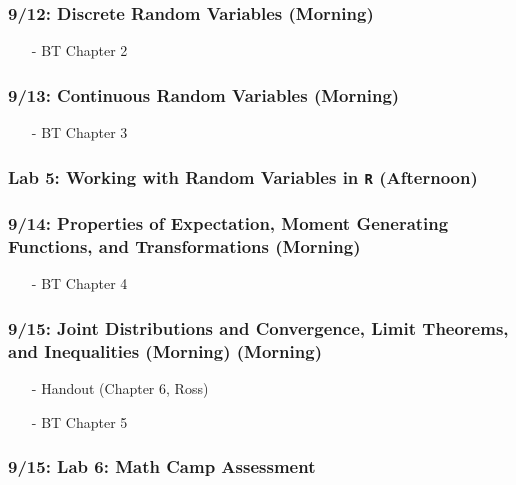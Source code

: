 \documentclass[11pt,letterpaper]{article}
\numberwithin{equation}{section}
\begin{document}
\subsubsection*{9/12: Discrete Random Variables (Morning)}

\begin{itemize}
\item[-] BT Chapter 2
\end{itemize}


\subsubsection*{9/13: Continuous Random Variables (Morning)}

\begin{itemize}
\item[-] BT Chapter 3
\end{itemize}


\subsubsection*{Lab 5: Working with Random Variables in {\tt R} (Afternoon)}


\subsubsection*{9/14: Properties of Expectation, Moment Generating Functions, and Transformations (Morning)}

\begin{itemize}
\item[-] BT Chapter 4
\end{itemize}


\subsubsection*{9/15: Joint Distributions and  Convergence, Limit Theorems, and Inequalities (Morning) (Morning)}

\begin{itemize}
\item[-] Handout (Chapter 6, Ross)
\item[-] BT Chapter 5
\end{itemize}


\subsubsection*{9/15: Lab 6: Math Camp Assessment}
\end{document}
